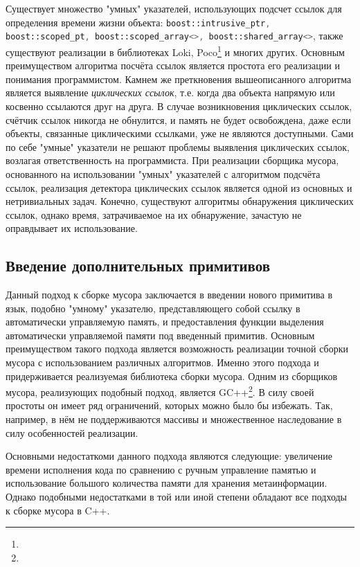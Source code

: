 Существует множество "умных" указателей, использующих подсчет ссылок для определения времени жизни объекта:
\lstinline[language= cpp]{boost::intrusive_ptr, boost::scoped_pt, boost::scoped_array<>, boost::shared_array<>},
также существуют реализации в библиотеках Loki\cite{Alexandrescu}, Poco\footnote{} и многих других.
Основным преимуществом алгоритма посчёта ссылок является простота его реализации и понимания программистом.
Камнем же преткновения вышеописанного алгоритма является выявление \textit{циклических ссылок}, т.е. когда два объекта
напрямую или косвенно ссылаются друг на друга. В случае возникновения циклических ссылок, счётчик ссылок никогда не обнулится,
и память не будет освобождена, даже если объекты, связанные циклическими ссылками, уже не являются доступными.
Сами по себе "умные" указатели не решают проблемы выявления циклических ссылок, возлагая ответственность на программиста.
При реализации сборщика мусора, основанного на использовании "умных" указателей с алгоритмом подсчёта ссылок,
реализация детектора циклических ссылок является одной из основных и нетривиальных задач.
Конечно, существуют алгоритмы обнаружения циклических ссылок, однако время, затрачиваемое на их обнаружение,
зачастую не оправдывает их использование.

\subsection{Введение дополнительных примитивов}
Данный подход к сборке мусора заключается в введении нового примитива в язык, подобно "умному" указателю,
представляющего собой ссылку в автоматически управляемую память, и предоставления функции выделения автоматически управляемой
памяти под введенный примитив.
Основным преимуществом такого подхода является возможность реализации точной сборки мусора с использованием различных алгоритмов.
Именно этого подхода и придерживается реализуемая библиотека сборки мусора.
Одним из сборщиков мусора, реализующих подобный подход, является GC++\footnote{}. В силу своей простоты он имеет ряд ограничений, которых можно было бы избежать.
Так, например, в нём не поддерживаются массивы и множественное наследование в силу особенностей реализации.

Основными недостаткоми данного подхода являются следующие:
увеличение времени исполнения кода по сравнению с ручным управление памятью
и использование большого количества памяти для хранения метаинформации.
Однако подобными недостатками в той или иной степени обладают все подходы к сборке мусора в C++.